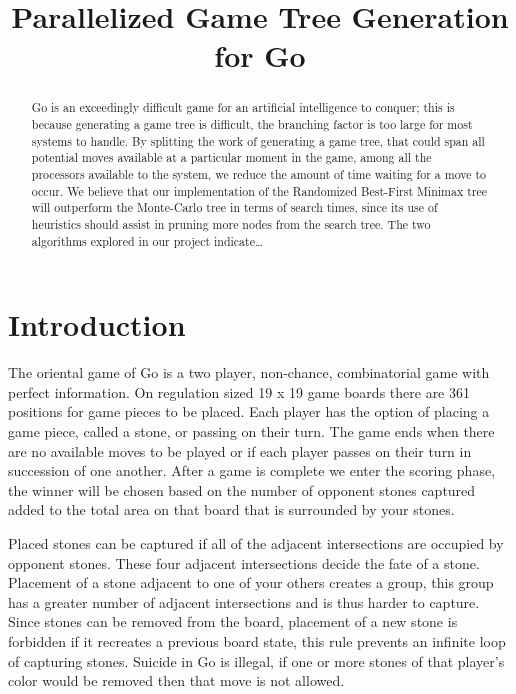 \documentclass[conference]{IEEEtran}
\begin{document}
\title{Parallelized Game Tree Generation\\for Go}


\author{
}

\maketitle


\begin{abstract}
Go is an exceedingly difficult game for an artificial intelligence to conquer; this is because generating a game tree is difficult, the branching factor is too large for most systems to handle. By splitting the work of generating a game tree, that could span all potential moves available at a particular moment in the game, among all the processors available to the system, we reduce the amount of time waiting for a move to occur. We believe that our implementation of the Randomized Best-First Minimax tree will outperform the Monte-Carlo tree in terms of search times, since its use of heuristics should assist in pruning more nodes from the search tree. The two algorithms explored in our project indicate\dots

\end{abstract}


\section{Introduction}
The oriental game of Go is a two player, non-chance, combinatorial game with perfect information. On regulation sized 19 x 19 game boards there are 361 positions for game pieces to be placed. Each player has the option of placing a game piece, called a stone, or passing on their turn. The game ends when there are no available moves to be played or if each player passes on their turn in succession of one another. After a game is complete we enter the scoring phase, the winner will be chosen based on the number of opponent stones captured added to the total area on that board that is surrounded by your stones.\par
Placed stones can be captured if all of the adjacent intersections are occupied by opponent stones. These four adjacent intersections decide the fate of a stone. Placement of a stone adjacent to one of your others creates a group, this group has a greater number of adjacent intersections and is thus harder to capture. Since stones can be removed from the board, placement of a new stone is forbidden if it recreates a previous board state, this rule prevents an infinite loop of capturing stones. Suicide in Go is illegal, if one or more stones of that player's color would be removed then that move is not allowed.
\end{document}
